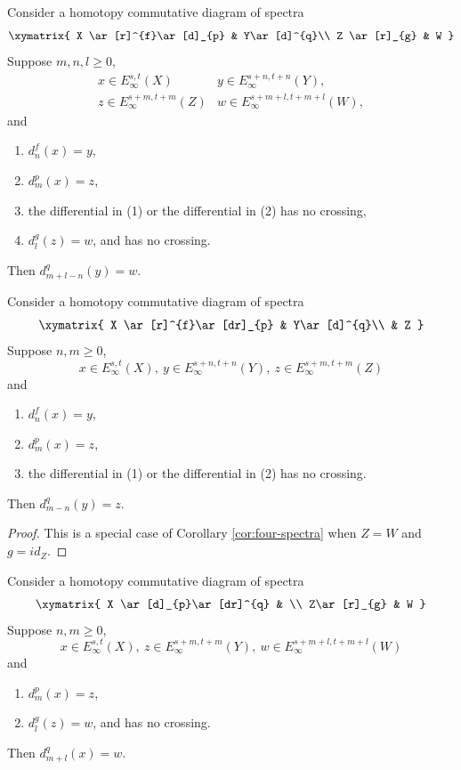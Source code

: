 \begin{corollary} \label{cor:four-spectra}
    Consider a homotopy commutative diagram of spectra
    $$\xymatrix{
    X \ar[r]^{f}\ar[d]_{p} & Y\ar[d]^{q}\\
    Z \ar[r]_{g} & W
    }$$
    Suppose $m,n,l\ge 0$,
    $$\begin{array}{ll}
        x\in E^{s,t}_\infty(X) & y\in E^{s+n,t+n}_\infty(Y),\\
        z\in E^{s+m,t+m}_\infty(Z) & w\in E^{s+m+l,t+m+l}_\infty(W),
    \end{array}$$
    and
    \begin{enumerate}
        \item $d^{f}_{n}(x)=y$,
        \item $d^{p}_{m}(x)=z$,
        \item the differential in (1) or the differential in (2) has no crossing,
        \item $d^{g}_{l}(z)=w$, and has no crossing.
    \end{enumerate}
    Then $d^{q}_{m+l-n}(y)=w$.
\end{corollary}

\begin{corollary} \label{cor:triangle-map}
    Consider a homotopy commutative diagram of spectra
    $$\xymatrix{
    X \ar[r]^{f}\ar[dr]_{p} & Y\ar[d]^{q}\\
    & Z
    }$$
    Suppose $n,m\ge 0$, 
    $$x\in E^{s,t}_\infty(X), ~y\in E^{s+n,t+n}_\infty(Y), ~z\in E^{s+m,t+m}_\infty(Z)$$
    and
    \begin{enumerate}
        \item $d^{f}_{n}(x)=y$,
        \item $d^{p}_{m}(x)=z$,
        \item the differential in (1) or the differential in (2) has no crossing.
    \end{enumerate}
    Then $d^{q}_{m-n}(y)=z$.
\end{corollary}

\begin{proof}
This is a special case of Corollary \ref{cor:four-spectra} when $Z=W$ and $g=id_Z$.
\end{proof}

\begin{corollary} \label{cor:composition-ext}
    Consider a homotopy commutative diagram of spectra
    $$\xymatrix{
    X \ar[d]_{p}\ar[dr]^{q} & \\
    Z\ar[r]_{g} & W
    }$$
    Suppose $n,m\ge 0$, 
    $$x\in E^{s,t}_\infty(X), ~z\in E^{s+m,t+m}_\infty(Y), ~w\in E^{s+m+l,t+m+l}_\infty(W)$$
    and
    \begin{enumerate}
        \item $d^{p}_{m}(x)=z$,
        \item $d^{g}_{l}(z)=w$, and has no crossing.
    \end{enumerate}
    Then $d^{q}_{m+l}(x)=w$.
\end{corollary}


